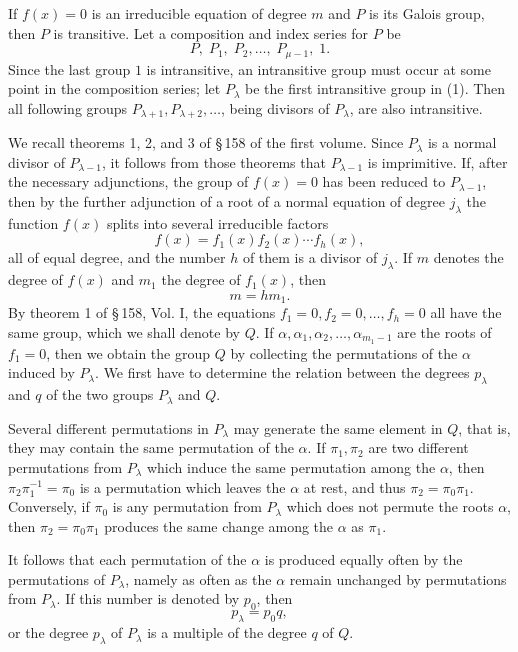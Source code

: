\documentclass[11pt]{article}
\begin{document}
If $f(x)=0$ is an irreducible equation of degree $m$ and $P$ is its Galois group, then $P$ is transitive. Let a composition and index series for $P$ be
\begin{equation}
 P,\;P_1,\;P_2,\ldots,\;P_{\mu-1},\;1 .
 \tag{1}
\end{equation}
Since the last group $1$ is intransitive, an intransitive group must occur at some point in the composition series; let $P_\lambda$ be the first intransitive group in (1). Then all following groups $P_{\lambda+1},P_{\lambda+2},\ldots$, being divisors of $P_\lambda$, are also intransitive.

We recall theorems 1, 2, and 3 of \S\,158 of the first volume. Since $P_\lambda$ is a normal divisor of $P_{\lambda-1}$, it follows from those theorems that $P_{\lambda-1}$ is imprimitive. If, after the necessary adjunctions, the group of $f(x)=0$ has been reduced to $P_{\lambda-1}$, then by the further adjunction of a root of a normal equation of degree $j_\lambda$ the function $f(x)$ splits into several irreducible factors
\begin{equation}
 f(x)=f_1(x)f_2(x)\cdots f_h(x),
 \tag{2}
\end{equation}
all of equal degree, and the number $h$ of them is a divisor of $j_\lambda$. If $m$ denotes the degree of $f(x)$ and $m_1$ the degree of $f_1(x)$, then
\begin{equation}
 m=hm_1 .
 \tag{3}
\end{equation}
By theorem 1 of \S\,158, Vol. I, the equations $f_1=0,f_2=0,\ldots,f_h=0$ all have the same group, which we shall denote by $Q$. If $\alpha,\alpha_1,\alpha_2,\ldots,\alpha_{m_1-1}$ are the roots of $f_1=0$, then we obtain the group $Q$ by collecting the permutations of the $\alpha$ induced by $P_\lambda$. We first have to determine the relation between the degrees $p_\lambda$ and $q$ of the two groups $P_\lambda$ and $Q$.

Several different permutations in $P_\lambda$ may generate the same element in $Q$, that is, they may contain the same permutation of the $\alpha$. If $\pi_1,\pi_2$ are two different permutations from $P_\lambda$ which induce the same permutation among the $\alpha$, then $\pi_2\pi_1^{-1}=\pi_0$ is a permutation which leaves the $\alpha$ at rest, and thus $\pi_2=\pi_0\pi_1$. Conversely, if $\pi_0$ is any permutation from $P_\lambda$ which does not permute the roots $\alpha$, then $\pi_2=\pi_0\pi_1$ produces the same change among the $\alpha$ as $\pi_1$.

It follows that each permutation of the $\alpha$ is produced equally often by the permutations of $P_\lambda$, namely as often as the $\alpha$ remain unchanged by permutations from $P_\lambda$. If this number is denoted by $p_0$, then
\begin{equation}
 p_\lambda=p_0q,
 \tag{4}
\end{equation}
or the degree $p_\lambda$ of $P_\lambda$ is a multiple of the degree $q$ of $Q$.
\end{document}
